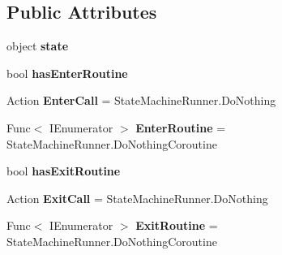 \subsection*{Public Attributes}
\begin{DoxyCompactItemize}
\item 
object {\bfseries state}\hypertarget{class_monster_love_1_1_state_machine_1_1_state_mapping_a6eedeba0f93713573fd4e8d0ae011d40}{}\label{class_monster_love_1_1_state_machine_1_1_state_mapping_a6eedeba0f93713573fd4e8d0ae011d40}

\item 
bool {\bfseries has\+Enter\+Routine}\hypertarget{class_monster_love_1_1_state_machine_1_1_state_mapping_a1e430fb562ea6b1f7855b4bde6579390}{}\label{class_monster_love_1_1_state_machine_1_1_state_mapping_a1e430fb562ea6b1f7855b4bde6579390}

\item 
Action {\bfseries Enter\+Call} = State\+Machine\+Runner.\+Do\+Nothing\hypertarget{class_monster_love_1_1_state_machine_1_1_state_mapping_a0468ee0d0a79f5a9f0c2b59e5b7f7d82}{}\label{class_monster_love_1_1_state_machine_1_1_state_mapping_a0468ee0d0a79f5a9f0c2b59e5b7f7d82}

\item 
Func$<$ I\+Enumerator $>$ {\bfseries Enter\+Routine} = State\+Machine\+Runner.\+Do\+Nothing\+Coroutine\hypertarget{class_monster_love_1_1_state_machine_1_1_state_mapping_a1baece2ae5d2ab0e78383b3bfc27c8eb}{}\label{class_monster_love_1_1_state_machine_1_1_state_mapping_a1baece2ae5d2ab0e78383b3bfc27c8eb}

\item 
bool {\bfseries has\+Exit\+Routine}\hypertarget{class_monster_love_1_1_state_machine_1_1_state_mapping_ab021aa098acff39e30b3dd6b7b2f6ae8}{}\label{class_monster_love_1_1_state_machine_1_1_state_mapping_ab021aa098acff39e30b3dd6b7b2f6ae8}

\item 
Action {\bfseries Exit\+Call} = State\+Machine\+Runner.\+Do\+Nothing\hypertarget{class_monster_love_1_1_state_machine_1_1_state_mapping_a6ba9f24c30435f4461518f582e43ae56}{}\label{class_monster_love_1_1_state_machine_1_1_state_mapping_a6ba9f24c30435f4461518f582e43ae56}

\item 
Func$<$ I\+Enumerator $>$ {\bfseries Exit\+Routine} = State\+Machine\+Runner.\+Do\+Nothing\+Coroutine\hypertarget{class_monster_love_1_1_state_machine_1_1_state_mapping_a58b86d6846f772c22d04cb68607e4e15}{}\label{class_monster_love_1_1_state_machine_1_1_state_mapping_a58b86d6846f772c22d04cb68607e4e15}


\end{DoxyCompactItemize}
